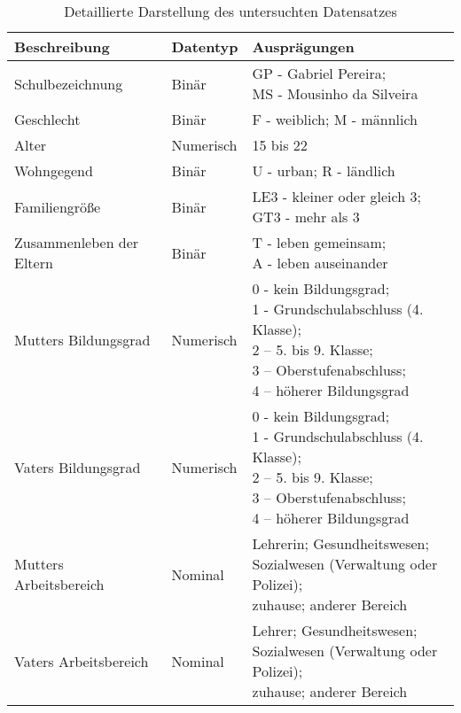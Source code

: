 \begin{table}[!ht]
    \centering
    \caption{Detaillierte Darstellung des untersuchten Datensatzes}
    \label{tab:detailed_data}
    \begin{tabular}{lll}
    \hline
        \textbf{Beschreibung} & \textbf{Datentyp} & \textbf{Ausprägungen} \\ \hline \hline
        Schulbezeichnung & Binär & \makecell[l]{GP - Gabriel Pereira; \\ MS - Mousinho da Silveira} \\ \hline
        Geschlecht & Binär & F - weiblich; M - männlich \\  \hline
        Alter & Numerisch & 15 bis 22 \\  \hline
        Wohngegend & Binär & U - urban; R - ländlich \\  \hline
        Familiengröße & Binär & \makecell[l]{LE3 - kleiner oder gleich 3; \\ GT3 - mehr als 3} \\  \hline
        Zusammenleben der Eltern & Binär & \makecell[l]{T - leben gemeinsam; \\ A - leben auseinander} \\  \hline
        Mutters Bildungsgrad & Numerisch & \makecell[l]{0 - kein Bildungsgrad; \\ 1 - Grundschulabschluss (4. Klasse); \\2 – 5. bis 9. Klasse; \\3 – Oberstufenabschluss; \\4 – höherer Bildungsgrad }\\  \hline
        Vaters Bildungsgrad & Numerisch & \makecell[l]{0 - kein Bildungsgrad; \\ 1 - Grundschulabschluss (4. Klasse); \\2 – 5. bis 9. Klasse; \\3 – Oberstufenabschluss; \\4 – höherer Bildungsgrad }\\  \hline
        Mutters Arbeitsbereich & Nominal & \makecell[l]{Lehrerin; Gesundheitswesen; \\Sozialwesen (Verwaltung oder Polizei); \\zuhause; anderer Bereich }\\  \hline
        Vaters Arbeitsbereich & Nominal & \makecell[l]{Lehrer; Gesundheitswesen; \\Sozialwesen (Verwaltung oder Polizei); \\zuhause; anderer Bereich }\\  \hline

\end{tabular}
\end{table}
